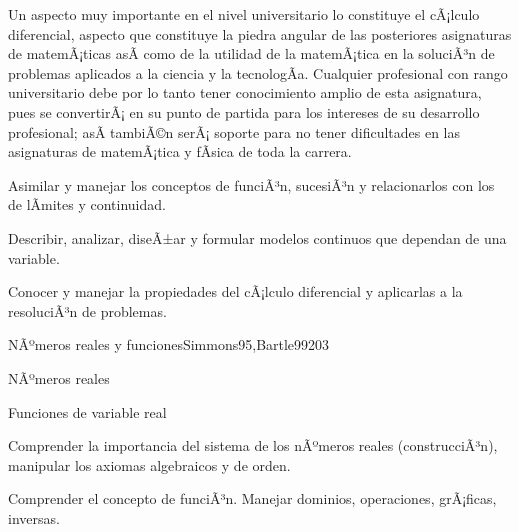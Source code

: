 \begin{syllabus}


\begin{justification}
Un aspecto muy importante en el nivel universitario lo constituye el cÃ¡lculo diferencial,  aspecto que constituye la piedra angular de las posteriores asignaturas de matemÃ¡ticas asÃ­ como de la utilidad de la matemÃ¡tica en la soluciÃ³n de problemas aplicados a la ciencia y la tecnologÃ­a. Cualquier profesional con rango universitario debe por lo tanto tener conocimiento amplio de esta asignatura, pues se convertirÃ¡ en su punto de partida para los intereses de su desarrollo profesional; asÃ­ tambiÃ©n serÃ¡ soporte para no tener dificultades en las asignaturas de matemÃ¡tica y fÃ­sica de toda la carrera.
\end{justification}

\begin{goals}
\item Asimilar y manejar los conceptos de funciÃ³n, sucesiÃ³n y relacionarlos con los de lÃ­mites y continuidad.
\item Describir, analizar, diseÃ±ar y formular modelos continuos que dependan de una variable.
\item Conocer y manejar la propiedades del cÃ¡lculo diferencial y aplicarlas a la resoluciÃ³n de problemas.
\end{goals}

\begin{outcomes}
\end{outcomes}

\begin{unit}{NÃºmeros reales y funciones}{Simmons95,Bartle99}{20}{3}
   \begin{topics}
      \item NÃºmeros reales
      \item Funciones de variable real
   \end{topics}

   \begin{unitgoals}
      \item Comprender la importancia del sistema de los nÃºmeros reales (construcciÃ³n), manipular los axiomas algebraicos y de orden.
      \item Comprender el concepto de funciÃ³n. Manejar dominios, operaciones, grÃ¡ficas, inversas.
      \end{unitgoals}
\end{unit}


\end{syllabus}
